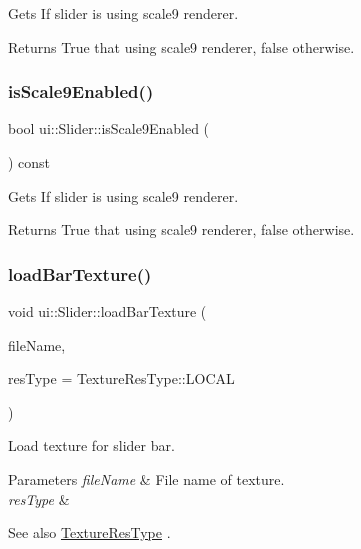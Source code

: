 Gets If slider is using scale9 renderer. \begin{DoxyReturn}{Returns}
True that using scale9 renderer, false otherwise. 
\end{DoxyReturn}
\mbox{\label{classui_1_1Slider_ade445792dc967b0556309956621f787a}} 
\subsubsection{\texorpdfstring{is\+Scale9\+Enabled()}{isScale9Enabled()}\hspace{0.1cm}{\footnotesize\ttfamily [2/2]}}
{\footnotesize\ttfamily bool ui\+::\+Slider\+::is\+Scale9\+Enabled (\begin{DoxyParamCaption}{ }\end{DoxyParamCaption}) const}

Gets If slider is using scale9 renderer. \begin{DoxyReturn}{Returns}
True that using scale9 renderer, false otherwise. 
\end{DoxyReturn}
\mbox{\label{classui_1_1Slider_a20859a6757a6d477d307e8b70de15805}} 
\subsubsection{\texorpdfstring{load\+Bar\+Texture()}{loadBarTexture()}\hspace{0.1cm}{\footnotesize\ttfamily [1/2]}}
{\footnotesize\ttfamily void ui\+::\+Slider\+::load\+Bar\+Texture (\begin{DoxyParamCaption}\item[{const std\+::string \&}]{file\+Name,  }\item[{\hyperlink{classui_1_1Widget_a040a65ec5ad3b11119b7e16b98bd9af0}{Texture\+Res\+Type}}]{res\+Type = {\ttfamily TextureResType\+:\+:LOCAL} }\end{DoxyParamCaption})}

Load texture for slider bar.


\begin{DoxyParams}{Parameters}
{\em file\+Name} & File name of texture. \\
\hline
{\em res\+Type} & \\
\hline
\end{DoxyParams}
\begin{DoxySeeAlso}{See also}
\hyperlink{classui_1_1Widget_a040a65ec5ad3b11119b7e16b98bd9af0}{Texture\+Res\+Type} . 
\end{DoxySeeAlso}
\mbox{\label{classui_1_1Slider_a20859a6757a6d477d307e8b70de15805}} 
